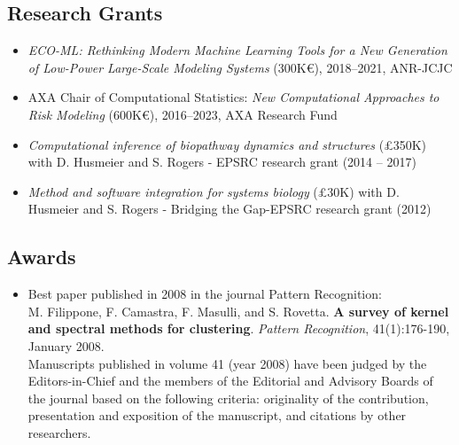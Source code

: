 \documentclass[a4paper,10pt]{article}
\begin{document}

\subsection*{Research Grants}
\begin{itemize}
  \item \emph{ECO-ML: Rethinking Modern Machine Learning Tools for a New Generation of Low-Power Large-Scale Modeling Systems} (300K\euro), 2018--2021, ANR-JCJC 
  \item AXA Chair of Computational Statistics: \emph{New Computational Approaches to Risk Modeling} (600K\euro), 2016--2023, AXA Research Fund 
  \item \emph{Computational inference of biopathway dynamics and structures} (\pounds 350K) with D. Husmeier and S. Rogers - EPSRC research grant (2014 -- 2017)
  \item \emph{Method and software integration for systems biology} (\pounds 30K) with D. Husmeier and S. Rogers - Bridging the Gap-EPSRC research grant (2012)
\end{itemize}

\subsection*{Awards}
\begin{itemize}
     \item Best paper published in 2008 in the journal Pattern Recognition:
       \\M. Filippone, F. Camastra, F. Masulli, and S. Rovetta.
       \textbf{A survey of kernel and spectral methods for clustering}.
       \emph{Pattern Recognition}, 41(1):176-190, January 2008.
       \\Manuscripts published in volume 41 (year 2008) have been judged by the Editors-in-Chief and the members of the Editorial and Advisory Boards of the journal based on the following criteria: originality of the contribution, presentation and exposition of the manuscript, and citations by other researchers.
\end{itemize}
\end{document}
